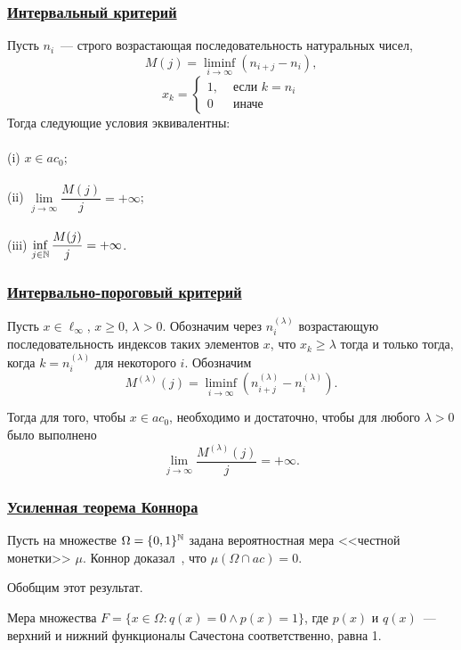 \begin{frame}\frametitle{\underline{Интервальный критерий}}
		\label{thm:M_j_ac0_inf_lim}
		Пусть $n_i$~--- строго возрастающая последовательность натуральных чисел,
		\begin{equation}
			\label{eq:definition_M_j}
			M(j) = \liminf_{i\to\infty} \left(n_{i+j} - n_i\right),
		\end{equation}
		\begin{equation}
			x_k = \left\{\begin{array}{ll}
				1, & \mbox{~если~} k = n_i
				\\
				0  & \mbox{~иначе~}
			\end{array}\right.
		\end{equation}
		Тогда следующие условия эквивалентны:
		\\~\\
		(i)   $x \in ac_0$;
		\\~\\
		(ii)  $\lim\limits_{j \to \infty} \dfrac{M(j)}{j} = +\infty$;
		\\~\\
		(iii) $\inf\limits_{j \in \mathbb{N}}     \dfrac{M(j)}{j} = +\infty$.
\end{frame}


\begin{frame}\frametitle{\underline{Интервально-пороговый критерий}}
	\begin{ttheorem}
		Пусть $x\in\ell_\infty$, $x \geq 0$, $\lambda>0$.
		Обозначим через $n^{(\lambda)}_i$ возрастающую последовательность
		индексов таких элементов $x$, что $x_k \geq \lambda$ тогда и только тогда,
		когда $k=n^{(\lambda)}_i$ для некоторого $i$.
		Обозначим
		\begin{equation}
			M^{(\lambda)}(j) = \liminf_{i\to\infty} \left(n^{(\lambda)}_{i+j} - n^{(\lambda)}_i\right)
			.
		\end{equation}


		Тогда для того, чтобы $x\in ac_0$, необходимо и достаточно, чтобы
		для любого $\lambda>0$ было выполнено
		\begin{equation}
			\lim_{j \to \infty} \frac{M^{(\lambda)}(j)}{j} = +\infty
			.
		\end{equation}
	\end{ttheorem}
\end{frame}


\begin{frame}\frametitle{\underline{Усиленная теорема Коннора}}
	Пусть на множестве $\Omega=\{0,1\}^{\mathbb{N}}$ задана вероятностная мера <<честной монетки>> $\mu$.
	Коннор доказал~\cite{connor1990almost}, что $\mu(\Omega\cap ac)=0$.

	Обобщим этот результат.

	\begin{ttheorem}
	Мера множества $F=\{x\in\Omega : q(x) = 0 \wedge p(x)= 1\}$,
	где $p(x)$ и $q(x)$~--- верхний и нижний функционалы Сачестона соответственно,
	равна 1.
	\end{ttheorem}
\end{frame}


